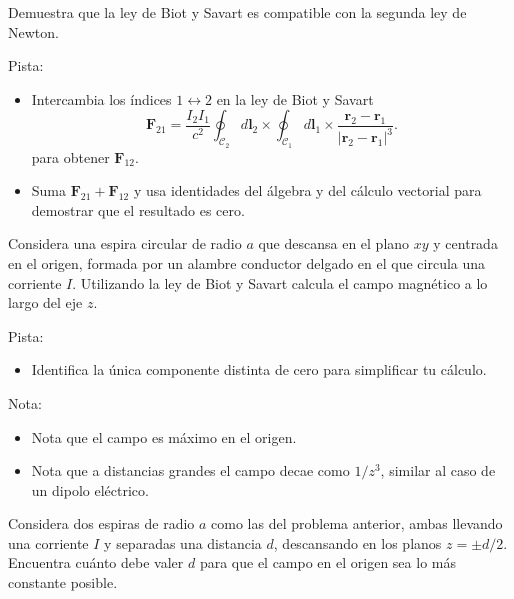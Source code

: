 \documentclass{exam}
\begin{document}
\begin{questions}
  \question Demuestra que la ley de Biot y Savart es compatible con la
    segunda ley de Newton.

    Pista:
    \begin{itemize}
    \item Intercambia los índices $1\leftrightarrow2$ en la ley
      de Biot y Savart
      $$
      \bm F_{21}=\frac{I_2I_1}{c^2}\oint_{\mathcal
        C_2}d\bm l_2\times\oint_{\mathcal C_1}d\bm l_1\times \frac{\bm r_2-\bm r_1}{|\bm
        r_2-\bm r_1|^3}.
      $$
      para obtener $\bm F_{12}$.
    \item Suma $\bm F_{21}+\bm F_{12}$ y usa identidades del álgebra y
      del cálculo vectorial para demostrar que el resultado es cero.
    \end{itemize}

  \question Considera una espira circular de radio $a$ que descansa en
    el plano $xy$ y centrada en el origen, formada por un alambre
    conductor delgado en el que circula una corriente $I$. Utilizando
    la ley de Biot y Savart calcula el campo magnético a lo largo del
    eje $z$.

    Pista:
    \begin{itemize}
    \item Identifica la única componente distinta de cero para
      simplificar tu cálculo.
    \end{itemize}
    Nota:
    \begin{itemize}
    \item Nota que el campo es máximo en el origen.
    \item Nota que a distancias grandes el campo decae como $1/z^3$,
      similar al caso de un dipolo eléctrico.
    \end{itemize}

  \question Considera dos espiras de radio $a$ como las del problema
    anterior, ambas llevando una corriente $I$ y
    separadas una distancia $d$, descansando en los planos $z=\pm d/2$. Encuentra cuánto
    debe valer $d$ para que el campo en el origen sea lo más constante
    posible.


\end{questions}
\end{document}
